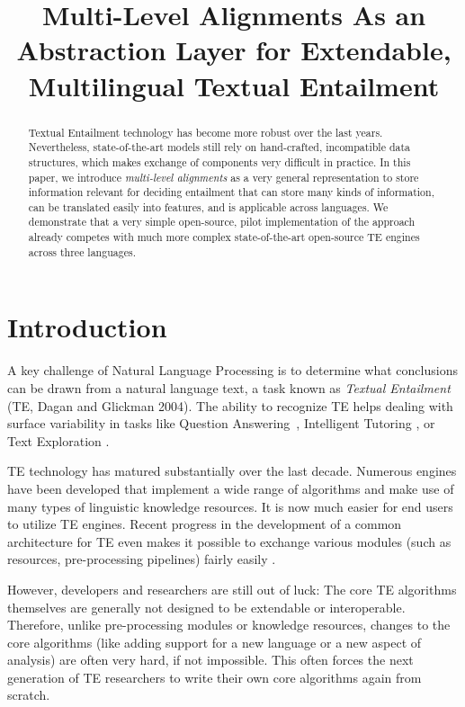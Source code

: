 \documentclass[11pt,letterpaper]{article}
\title{Multi-Level Alignments As an Abstraction Layer for Extendable,
  Multilingual Textual Entailment}
\date{}
\begin{document}
\maketitle
\begin{abstract}
  Textual Entailment technology has become more robust over the last
  years. Nevertheless, state-of-the-art models still rely on
  hand-crafted, incompatible data structures, which makes exchange of
  components very difficult in practice. In this paper, we introduce
  {\em multi-level alignments} as a very general representation to
  store information relevant for deciding entailment that can store
  many kinds of information, can be translated easily into features,
  and is applicable across languages. We demonstrate that a very
  simple open-source, pilot implementation of the approach already
  competes with much more complex state-of-the-art open-source TE
  engines across three languages.
\end{abstract}

\section{Introduction}
A key challenge of Natural Language Processing is to determine what
conclusions can be drawn from a natural language text, a task known as
\textit{Textual Entailment} (TE, Dagan and Glickman
2004).\nocite{dagan04:_probab_textual_entail} The ability to recognize
TE helps dealing with surface variability in tasks like Question
Answering~\cite{harabagiu-hickl:2006:COLACL}, Intelligent Tutoring
\cite{nielsen09:_recog_entail_in_intel_tutor_system}, or Text
Exploration \cite{berant2012learning}.

TE technology has matured substantially over the last decade. Numerous
engines have been developed that implement a wide range of algorithms
and make use of many types of linguistic knowledge resources. It is
now much easier for end users to utilize TE engines. Recent progress
in the development of a common architecture for TE even makes it
possible to exchange various modules (such as resources,
pre-processing pipelines) fairly easily \cite{EOP-arch}.

However, developers and researchers are still out of luck: The core TE
algorithms themselves are generally not designed to be extendable or
interoperable. Therefore, unlike pre-processing modules or knowledge
resources, changes to the core algorithms (like adding support for a
new language or a new aspect of analysis) are often very hard, if not
impossible. This often forces the next generation of TE researchers to
write their own core algorithms again from scratch.
\end{document}
